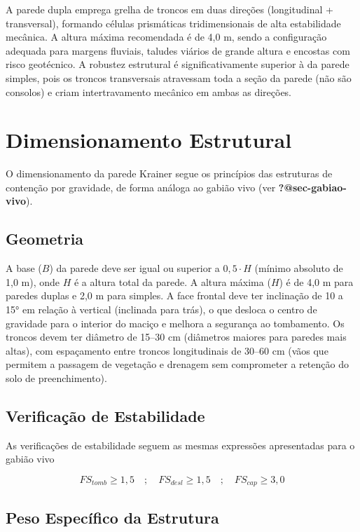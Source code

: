 \documentclass[
  portuguese,
  11pt,
  a4paper,
  open=any]{scrbook}
\begin{document}
A parede dupla emprega grelha de troncos em duas direções (longitudinal
+ transversal), formando células prismáticas tridimensionais de alta
estabilidade mecânica. A altura máxima recomendada é de 4,0 m, sendo a
configuração adequada para margens fluviais, taludes viários de grande
altura e encostas com risco geotécnico. A robustez estrutural é
significativamente superior à da parede simples, pois os troncos
transversais atravessam toda a seção da parede (não são consolos) e
criam intertravamento mecânico em ambas as direções.

\section{Dimensionamento Estrutural}\label{dimensionamento-estrutural-1}

O dimensionamento da parede Krainer segue os princípios das estruturas
de contenção por gravidade, de forma análoga ao gabião vivo (ver
\textbf{?@sec-gabiao-vivo}).

\subsection{Geometria}\label{geometria}

A base (\(B\)) da parede deve ser igual ou superior a \(0{,}5 \cdot H\)
(mínimo absoluto de 1,0 m), onde \(H\) é a altura total da parede. A
altura máxima (\(H\)) é de 4,0 m para paredes duplas e 2,0 m para
simples. A face frontal deve ter inclinação de 10 a 15° em relação à
vertical (inclinada para trás), o que desloca o centro de gravidade para
o interior do maciço e melhora a segurança ao tombamento. Os troncos
devem ter diâmetro de 15--30 cm (diâmetros maiores para paredes mais
altas), com espaçamento entre troncos longitudinais de 30--60 cm (vãos
que permitem a passagem de vegetação e drenagem sem comprometer a
retenção do solo de preenchimento).

\subsection{Verificação de
Estabilidade}\label{verificauxe7uxe3o-de-estabilidade}

As verificações de estabilidade seguem as mesmas expressões apresentadas
para o gabião vivo

\[
FS_{tomb} \geq 1{,}5 \quad;\quad FS_{desl} \geq 1{,}5 \quad;\quad FS_{cap} \geq 3{,}0
\]

\subsection{Peso Específico da
Estrutura}\label{peso-especuxedfico-da-estrutura}
\end{document}
